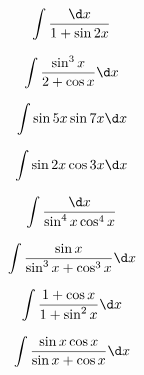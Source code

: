 \begin{question}
    \begin{equation*}
        \int \frac{\d x}{1 + \sin 2x}
    \end{equation*}
\end{question}

\begin{question}
    \begin{equation*}
        \int \frac{\sin^3 x}{2 + \cos x} \d x
    \end{equation*}
\end{question}

\begin{question}
    \begin{equation*}
        \int \sin 5x \sin 7x \d x
    \end{equation*}
\end{question}

\begin{question}
    \begin{equation*}
        \int \sin 2x \cos 3x \d x
    \end{equation*}
\end{question}

\begin{question}
    \begin{equation*}
        \int \frac{\d x}{\sin^4 x \cos^4 x}
    \end{equation*}
\end{question}

\begin{question}
    \begin{equation*}
        \int \frac{\sin x}{\sin^3 x + \cos^3 x} \d x
    \end{equation*}
\end{question}

\begin{question}
    \begin{equation*}
        \int \frac{1 + \cos x}{1 + \sin^2 x} \d x
    \end{equation*}
\end{question}

\begin{question}
    \begin{equation*}
        \int \frac{\sin x \cos x}{\sin x + \cos x} \d x
    \end{equation*}
\end{question}
